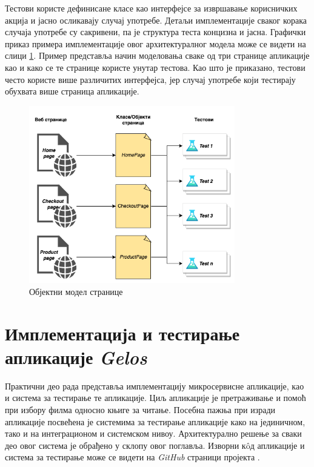 \documentclass[12pt,oneside]{memoir}
\begin{document}
Тестови користе дефинисане класе као интерфејсе за извршавање корисничких акција и јасно осликавају случај употребе. Детаљи имплементације сваког корака случаја употребе су сакривени, па је структура теста концизна и јасна. Графички приказ примера имплементације овог архитектуралног модела може се видети на слици \ref{fig:pom}. Пример представља начин моделовања сваке од три странице апликације као и како се те странице користе унутар тестова. Као што је приказано, тестови често користе више различитих интерфејса, јер случај употребе који тестирају обухвата више страница апликације.
\begin{figure}[!ht]
  \centering
  \includegraphics[width=0.8\textwidth]{matfmaster/img/pom.png}
  \caption{Објектни модел странице}
  \label{fig:pom}
\end{figure}


\chapter{Имплементација и тестирање апликације \textit{Gelos}}
\label{chp:aplikacija}
Практични део рада представља имплементацију микросервисне апликације, као и система за тестирање те апликације. Циљ апликације је претраживање и помоћ при избору филма односно књиге за читање. Посебна пажња при изради апликације посвећена је системима за тестирање апликације како на јединичном, тако и на интеграционом и системском нивоу. Архитектурално решење за сваки део овог система је обрађено у склопу овог поглавља. Изворни к\^{o}д апликације и система за тестирање може се видети на \textit{GitHub} страници пројекта \cite{projekat}.
\end{document}
